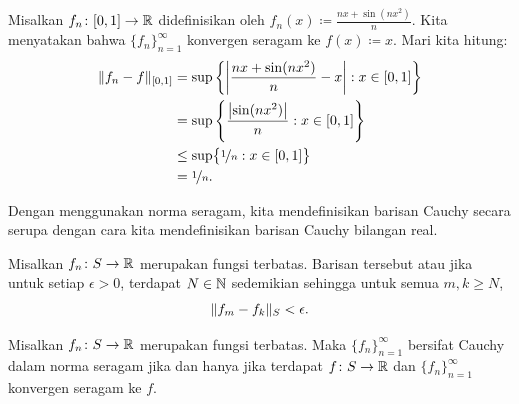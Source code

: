 \begin{example}
Misalkan $f_n \colon [0,1] \to {\mathbb{R}}$ didefinisikan oleh $f_n(x) \coloneqq \frac{nx+ \sin(nx^2)}{n}$.
Kita menyatakan bahwa $\{ f_n \}_{n=1}^\infty$ konvergen seragam ke $f(x) \coloneqq x$.  Mari kita hitung:
\begin{equation*}
\begin{split}
\lVert {f_n-f} \rVert_{[0,1]}
& =
\sup \left\{ \left\lvert {\frac{nx+ \sin(nx^2)}{n} - x} \right\rvert : x \in [0,1] \right\}
\\
& =
\sup \left\{ \frac{\bigl\lvert {\sin(nx^2)} \bigr\rvert}{n} : x \in [0,1] \right\}
\\
& \leq
\sup \bigl\{ \nicefrac{1}{n} : x \in [0,1] \bigr\}
\\
& = \nicefrac{1}{n}.
\end{split}
\end{equation*}
\end{example}

Dengan menggunakan norma seragam, kita mendefinisikan barisan Cauchy secara serupa dengan
cara kita mendefinisikan barisan Cauchy bilangan real.

\begin{defn}
Misalkan $f_n \colon S \to {\mathbb{R}}$ merupakan fungsi terbatas.
Barisan tersebut \emph{}
atau \emph{}
jika untuk setiap $\epsilon > 0$, terdapat $N \in {\mathbb{N}}$ sedemikian
sehingga untuk semua $m,k \geq N$,
\begin{equation*}
\lVert {f_m-f_k} \rVert_S < \epsilon .
\end{equation*}
\end{defn}

\begin{prop} \label{prop:uniformcauchy}
Misalkan $f_n \colon S \to {\mathbb{R}}$ merupakan fungsi terbatas.
Maka $\{ f_n \}_{n=1}^\infty$ bersifat Cauchy dalam norma seragam jika dan hanya jika
terdapat $f \colon S \to {\mathbb{R}}$ dan $\{ f_n \}_{n=1}^\infty$ konvergen
seragam ke $f$.
\end{prop}

